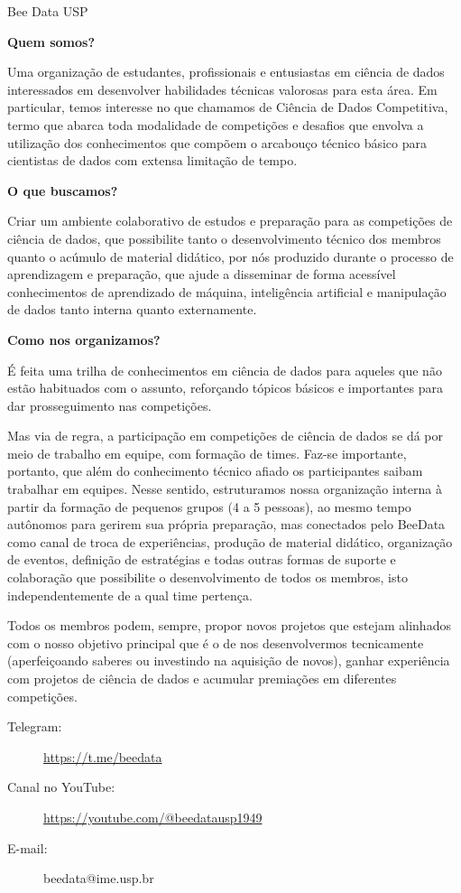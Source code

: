 \begin{subsecao}{Bee Data USP}


\textbf{Quem somos?}

Uma organização de estudantes, profissionais e entusiastas em ciência
de dados interessados em desenvolver habilidades técnicas valorosas para
esta área. Em particular, temos interesse no que chamamos de Ciência de
Dados Competitiva, termo que abarca toda modalidade de competições e desafios
que envolva a utilização dos conhecimentos que compõem o arcabouço técnico
básico para cientistas de dados com extensa limitação de tempo.

\textbf{O que buscamos?}

Criar um ambiente colaborativo de estudos e preparação para as competições de
ciência de dados, que possibilite tanto o desenvolvimento técnico dos membros
quanto o acúmulo de material didático, por nós produzido durante o processo de
aprendizagem e preparação, que ajude a disseminar de forma acessível conhecimentos
de aprendizado de máquina, inteligência artificial e manipulação de dados tanto
interna quanto externamente.

\textbf{Como nos organizamos?}

É feita uma trilha de conhecimentos em ciência de dados para aqueles que não
estão habituados com o assunto, reforçando tópicos básicos e importantes para dar
prosseguimento nas competições.

Mas via de regra, a participação em competições de ciência de dados se dá por meio
de trabalho em equipe, com formação de times. Faz-se importante, portanto, que
além do conhecimento técnico afiado os participantes saibam trabalhar em equipes.
Nesse sentido, estruturamos nossa organização interna à partir da formação de
pequenos grupos (4 a 5 pessoas), ao mesmo tempo autônomos para gerirem sua própria
preparação, mas conectados pelo BeeData como canal de troca de experiências, produção
de material didático, organização de eventos, definição de estratégias e todas outras
formas de suporte e colaboração que possibilite o desenvolvimento de todos os membros,
isto independentemente de a qual time pertença.

Todos os membros podem, sempre, propor novos projetos que estejam alinhados com
o nosso objetivo principal que é o de nos desenvolvermos tecnicamente (aperfeiçoando
saberes ou investindo na aquisição de novos), ganhar experiência com projetos de
ciência de dados e acumular premiações em diferentes competições.

\begin{description}
  \item[Telegram:] \url{https://t.me/beedata}
  \item[Canal no YouTube:] \url{https://youtube.com/@beedatausp1949}
  \item[E-mail:] beedata@ime.usp.br
\end{description}

\end{subsecao}
